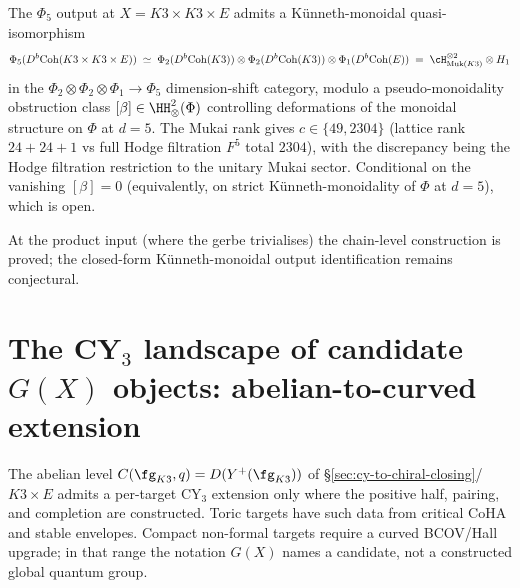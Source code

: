 \begin{conjecture}
\label{conj:phi-5-K3-K3-E-output}
\ClaimStatusConjectured
{}%
The $\Phi_5$ output at $X = K3 \times K3 \times E$ admits a K\"unneth-monoidal
quasi-isomorphism
\[
 \Phi_5(D^b\mathrm{Coh}(K3 \times K3 \times E)) \;\simeq\;
 \Phi_2(D^b\mathrm{Coh}(K3)) \otimes \Phi_2(D^b\mathrm{Coh}(K3)) \otimes
 \Phi_1(D^b\mathrm{Coh}(E))
 \;=\; \cH_{\mathrm{Muk}(K3)}^{\otimes 2} \otimes H_1
\]
in the $\Phi_2 \otimes \Phi_2 \otimes \Phi_1 \to \Phi_5$ dimension-shift
category, modulo a pseudo-monoidality obstruction class
$[\beta] \in \HH^2_{\otimes}(\Phi)$ controlling deformations of the monoidal
structure on $\Phi$ at $d = 5$.
The Mukai rank gives $c \in \{49, 2304\}$ \textup{(}lattice rank
$24 + 24 + 1$ vs full Hodge filtration $F^5$ total $2304$\textup{)}, with
the discrepancy being the Hodge filtration restriction to the unitary
Mukai sector. Conditional on the vanishing $[\beta] = 0$
\textup{(}equivalently, on strict K\"unneth-monoidality of $\Phi$ at
$d = 5$\textup{)}, which is open.
\end{conjecture}
At the product input \textup{(}where the gerbe trivialises\textup{)} the
chain-level construction is proved; the closed-form
K\"unneth-monoidal output identification remains conjectural.

\section{The CY\texorpdfstring{$_3$}{-3} landscape of candidate \texorpdfstring{$G(X)$}{G(X)} objects: abelian-to-curved extension}
\label{sec:cy3-landscape-GofX}

The abelian level $C(\fg_{K3}, q) = D(Y^+(\fg_{K3}))$ of
\S\ref{sec:cy-to-chiral-closing}/$K3 \times E$ admits a per-target CY$_3$
extension only where the positive half, pairing, and completion are
 constructed. Toric targets have such data from critical CoHA and
stable envelopes. Compact non-formal targets require a curved BCOV/Hall
upgrade; in that range the notation \(G(X)\) names a candidate, not a
constructed global quantum group.

